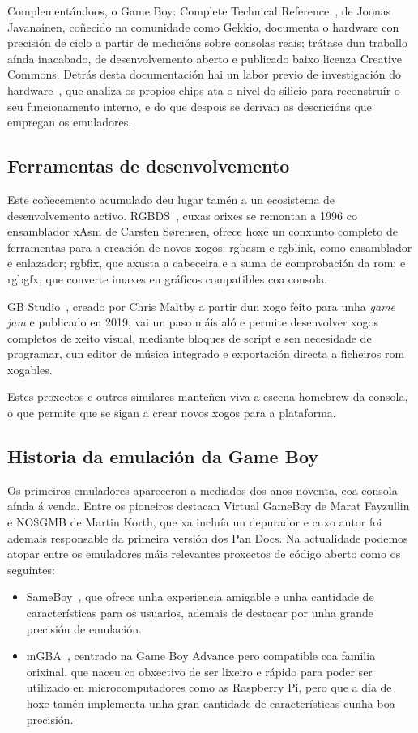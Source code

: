 Complementándoos, o Game Boy: Complete Technical Reference~\cite{gbctr},
de Joonas Javanainen, coñecido na comunidade como Gekkio,
documenta o hardware con precisión de ciclo a partir de medicións sobre consolas reais;
trátase dun traballo aínda inacabado, de desenvolvemento aberto e publicado baixo licenza Creative Commons.
Detrás desta documentación hai un labor previo de investigación do hardware~\cite{gbresearch},
que analiza os propios chips ata o nivel do silicio para reconstruír o seu funcionamento interno,
e do que despois se derivan as descricións que empregan os emuladores.

\subsection{Ferramentas de desenvolvemento}
Este coñecemento acumulado deu lugar tamén a un ecosistema de desenvolvemento activo.
RGBDS~\cite{rgbds},
cuxas orixes se remontan a 1996 co ensamblador xAsm de Carsten Sørensen,
ofrece hoxe un conxunto completo de ferramentas para a creación de novos xogos:
rgbasm e rgblink, como ensamblador e enlazador; rgbfix, que axusta a cabeceira
e a suma de comprobación da \acrfull{rom}; e rgbgfx, que converte imaxes en gráficos compatibles coa consola.


GB Studio~\cite{gbstudio},
creado por Chris Maltby a partir dun xogo feito para unha \textit{game jam}
e publicado en 2019,
vai un paso máis aló e permite desenvolver xogos completos de xeito visual,
mediante bloques de script e sen necesidade de programar,
cun editor de música integrado e exportación directa a ficheiros \acrshort{rom} xogables.

Estes proxectos e outros similares manteñen viva a escena \gls{homebrew} da consola,
o que permite que se sigan a crear novos xogos para a plataforma.


\subsection{Historia da emulación da Game Boy}
Os primeiros emuladores apareceron a mediados dos anos noventa,
coa consola aínda á venda.
Entre os pioneiros destacan Virtual GameBoy de Marat Fayzullin
e NO\$GMB de Martin Korth, que xa incluía un depurador
e cuxo autor foi ademais responsable da primeira versión dos Pan Docs.
Na actualidade podemos atopar entre os emuladores máis relevantes proxectos de código aberto como os seguintes:
\begin{itemize}
  \item SameBoy~\cite{sameboy}, que ofrece unha experiencia amigable e unha cantidade de características para os usuarios,
  ademais de destacar por unha grande precisión de emulación. 
  \item mGBA~\cite{mgba}, centrado na Game Boy Advance pero compatible coa familia orixinal, que naceu co obxectivo de ser
  lixeiro e rápido para poder ser utilizado en microcomputadores como as Raspberry Pi, pero que a día de hoxe tamén
  implementa unha gran cantidade de características cunha boa precisión.
\end{itemize}

